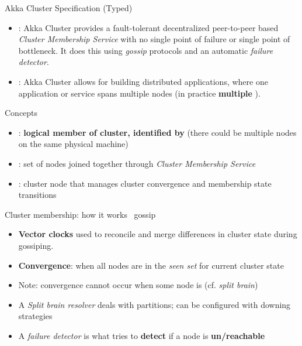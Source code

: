 \documentclass[presentation, 9pt]{beamer}\mode<presentation>{\usetheme{AMSBolognaFC}}
\begin{document}
\begin{frame}[c, allowframebreaks]{Akka Cluster Specification (Typed) \href{https://doc.akka.io/docs/akka/current/typed/cluster-concepts.html}{\faLink}}
	\begin{itemize}
	\item {}: Akka Cluster provides a fault-tolerant decentralized peer-to-peer based \emph{Cluster
	Membership Service} with no single point of failure or single point of bottleneck. It does this
	using \emph{gossip} protocols and an automatic \emph{failure detector}.
	\item {}: Akka Cluster allows for building distributed applications, where one
	application or service spans multiple nodes (in practice \textbf{multiple }).
	\end{itemize}
	\begin{alertblock}{Concepts}
		\begin{itemize}
			\item {}: \textbf{logical member of cluster, identified by } (there could be
			multiple nodes on the same physical machine)
			\item {}: set of nodes joined together through \emph{Cluster Membership Service}
			\item {}: cluster node that manages cluster convergence and membership state transitions
		\end{itemize}	
	\end{alertblock}
	\begin{alertblock}{Cluster membership: how it works \faArrowRight \, gossip}
		\begin{itemize}
			\item \textbf{Vector clocks} used to reconcile and merge differences in cluster state during gossiping.
			\item \textbf{Convergence}: when all nodes are in the \emph{seen set} for current cluster state
			\item Note: convergence cannot occur when some node is  (cf. \emph{split brain})
			\item A \emph{Split brain resolver} deals with partitions; can be configured with downing strategies
			\item A \emph{failure detector} is what tries to \textbf{detect} if a node is \textbf{un/reachable}
		\end{itemize}
	\end{alertblock}
\end{frame}
\end{document}

